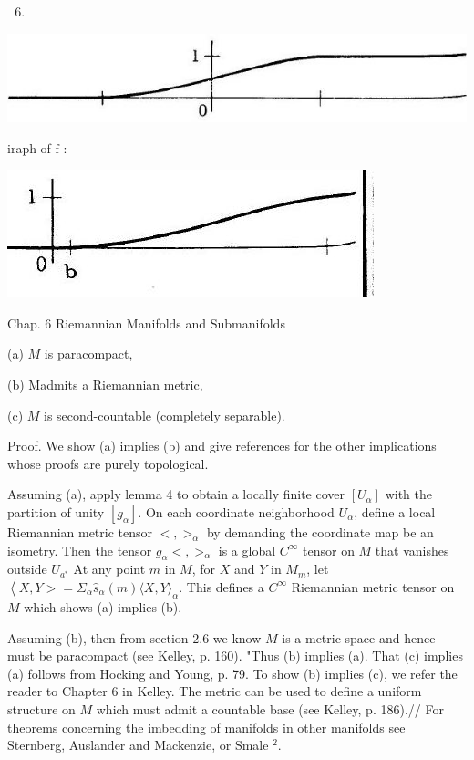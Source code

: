 \documentclass[10pt]{article}
\begin{document}
\begin{enumerate}
  \setcounter{enumi}{5}
  \item 
\end{enumerate}
\includegraphics[max width=\textwidth]{2022_07_16_f4e476ee2159dc67e746g-47(4)}

iraph of $\mathrm{f}$ :

\includegraphics[max width=\textwidth]{2022_07_16_f4e476ee2159dc67e746g-47(5)}

Chap. 6 Riemannian Manifolds and Submanifolds

(a) $M$ is paracompact,

(b) Madmits a Riemannian metric,

(c) $M$ is second-countable (completely separable).

Proof. We show (a) implies (b) and give references for the other implications whose proofs are purely topological.

Assuming (a), apply lemma 4 to obtain a locally finite cover $\left[U_{\alpha}\right]$ with the partition of unity $\left[g_{\alpha}\right]$. On each coordinate neighborhood $U_{\alpha}$, define a local Riemannian metric tensor $<,>_{\alpha}$ by demanding the coordinate map be an isometry. Then the tensor $g_{\alpha}<,>_{\alpha}$ is a global $C^{\infty}$ tensor on $M$ that vanishes outside $U_{a^{*}}$ At any point $m$ in $M$, for $X$ and $Y$ in $M_{m}$, let $\left\langle X, Y>=\Sigma_{\alpha} \hat{s}_{\alpha}(m)\langle X, Y\rangle_{\alpha}\right.$. This defines a $C^{\infty}$ Riemannian metric tensor on $M$ which shows (a) implies (b).

Assuming (b), then from section $2.6$ we know $M$ is a metric space and hence must be paracompact (see Kelley, p. 160). "Thus (b) implies (a). That (c) implies (a) follows from Hocking and Young, p. 79. To show (b) implies (c), we refer the reader to Chapter 6 in Kelley. The metric can be used to define a uniform structure on $M$ which must admit a countable base (see Kelley, p. 186).// For theorems concerning the imbedding of manifolds in other manifolds see Sternberg, Auslander and Mackenzie, or Smale ${ }^{2}$.
\end{document}
